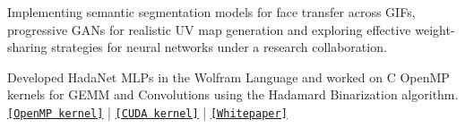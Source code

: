 \documentclass[]{deedy-resume-openfont}
\begin{document}

\sectionsep
{}
\begin{tightemize}
\item Implementing semantic segmentation models for face transfer across GIFs, progressive GANs for realistic UV map generation and exploring effective weight-sharing strategies for neural networks under a research collaboration.
\end{tightemize}

\sectionsep
{}
\begin{tightemize}
\item Developed HadaNet MLPs in the Wolfram Language and worked on C OpenMP kernels for GEMM and Convolutions using the Hadamard Binarization algorithm.  \href{https://github.com/akhauriyash/XNOR-Intel-ISA}{\texttt{[OpenMP kernel]}} | \href{https://github.com/akhauriyash/XNOR-convolution}{\texttt{[CUDA kernel]}} | \href{https://docs.google.com/document/d/18uynX2yDSWm1BVCtG3Rd4CRb6xHiRxbvprUBTb4lvjY/edit?usp=sharing}{\texttt{[Whitepaper]}}
\end{tightemize}

\sectionsep

\end{document}
